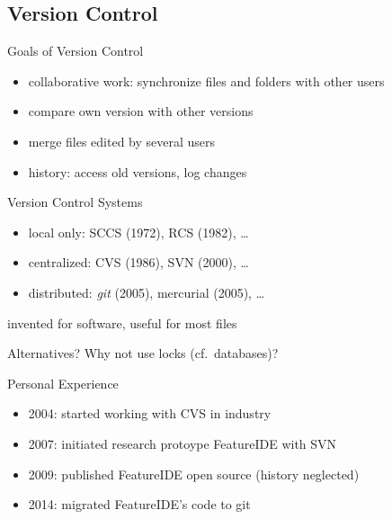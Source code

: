 \subsection{Version Control}
\begin{frame}{\insertsubsection}
	\begin{fancycolumns}
		\begin{note}{Goals of Version Control}
			\begin{itemize}
				\item collaborative work: synchronize files and folders with other users
				\item compare own version with other versions
				\item merge files edited by several users
				\item history: access old versions, log changes
			\end{itemize}
		\end{note}
		\begin{definition}{Version Control Systems}
			\begin{itemize}
				\item local only: SCCS (1972), RCS (1982), \ldots
				\item centralized: CVS (1986), SVN (2000), \ldots
				\item distributed: \emph{git} (2005), mercurial (2005), \ldots
			\end{itemize}
			\vspace{2mm}
			invented for software, useful for most files %
		\end{definition}
		\begin{example}{}
			Alternatives? Why not use locks (cf.\ databases)?
		\end{example}
		\nextcolumn
		\vspace{-4mm}
		\begin{example}{Personal Experience}
			\begin{itemize}
				\item 2004: started working with CVS in industry
				\item 2007: initiated research protoype FeatureIDE with SVN
				\item 2009: published FeatureIDE open source (history neglected)
				\item 2014: migrated FeatureIDE's code to git
			\end{itemize}
		\end{example}
	\end{fancycolumns}
\end{frame}

